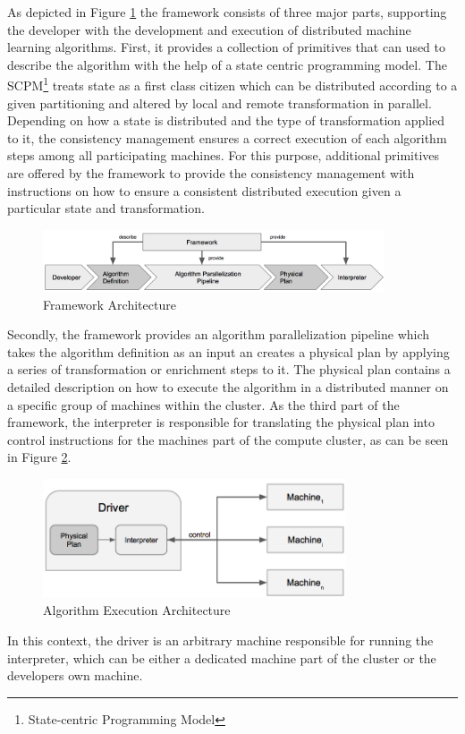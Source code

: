As depicted in Figure \ref{fig:framework_architecture} the framework consists of three major parts, supporting the developer with the development and execution of distributed machine learning algorithms.
First, it provides a collection of primitives that can used to describe the algorithm with the help of a state centric programming model.
The SCPM\footnote{State-centric Programming Model} treats state as a first class citizen which can be distributed according to a given partitioning and altered by local and remote transformation in parallel.
Depending on how a state is distributed and the type of transformation applied to it, the consistency management ensures a correct execution of each algorithm steps among all participating machines.
For this purpose, additional primitives are offered by the framework to provide the consistency management with instructions on how to ensure a consistent distributed execution given a particular state and transformation.
\begin{figure}[ht]
\centering
\includegraphics[width=0.9\textwidth]{img/framework_architecture.png}
\caption{Framework Architecture}
\label{fig:framework_architecture}
\end{figure}
Secondly, the framework provides an algorithm parallelization pipeline which takes the algorithm definition as an input an creates a physical plan by applying a series of transformation or enrichment steps to it.
The physical plan contains a detailed description on how to execute the algorithm in a distributed manner on a specific group of machines within the cluster.
As the third part of the framework, the interpreter is responsible for translating the physical plan into control instructions for the machines part of the compute cluster, as can be seen in Figure \ref{fig:framework_driver}.
\begin{figure}[ht]
\centering
\includegraphics[width=0.8\textwidth]{img/framework_driver.png}
\caption{Algorithm Execution Architecture}
\label{fig:framework_driver}
\end{figure}
In this context, the driver is an arbitrary machine responsible for running the interpreter, which can be either a dedicated machine part of the cluster or the developers own machine.

